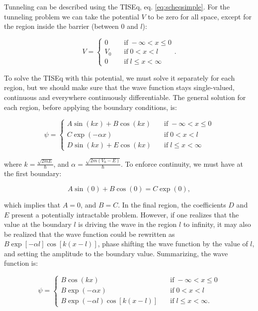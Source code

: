 \documentclass[
  english,
  9pt,
]{extbook}
\theoremstyle{definition}
\theoremstyle{definition}
\theoremstyle{definition}
\theoremstyle{definition}
\theoremstyle{remark}
\begin{document}
Tunneling can be described using the TISEq, eq. \eqref{eq:scheqsimple}. For the tunneling problem we can take the potential \(V\) to be zero for all space, except for the region inside the barrier (between \(0\) and \(l\)):

\begin{equation}
V=\begin{cases} 0\quad&\text{if}\; -\infty<x\leq 0 \\ V_0\quad&\text{if}\; 0<x<l \\ 0\quad&\text{if}\; l\leq x< \infty \end{cases}.
\label{eq:tunn1}  
\end{equation}

To solve the TISEq with this potential, we must solve it separately for each region, but we should make sure that the wave function stays single-valued, continuous and everywhere continuously differentiable. The general solution for each region, before applying the boundary conditions, is:

\begin{equation}
\psi=\begin{cases} A\sin (kx)+B\cos (kx)\quad&\text{if}\; -\infty<x\leq 0 \\ C \exp(-\alpha x) \quad&\text{if}\; 0<x<l \\ D\sin (kx)+E\cos (kx) \quad&\text{if}\; l\leq x< \infty \end{cases}
\label{eq:tunn2}  
\end{equation}

where \(k=\frac{\sqrt{2mE}}{\hbar}\), and \(\alpha=\frac{\sqrt{2m(V_0-E)}}{\hbar}\). To enforce continuity, we must have at the first boundary:

\begin{equation}
A\sin(0) +B \cos(0)=C\exp(0),
\label{eq:tunn3}  
\end{equation}

which implies that \(A=0\), and \(B=C\). In the final region, the coefficients \(D\) and \(E\) present a potentially intractable problem. However, if one realizes that the value at the boundary \(l\) is driving the wave in the region \(l\) to infinity, it may also be realized that the wave function could be rewritten as \(B\exp[-\alpha l]\cos[k(x-l)]\), phase shifting the wave function by the value of \(l\), and setting the amplitude to the boundary value. Summarizing, the wave function is:

\begin{equation}
\psi=\begin{cases} B\cos (kx)\quad&\text{if}\; -\infty<x\leq 0 \\ B \exp(-\alpha x)  \quad&\text{if}\; 0<x<l \\ B\exp(-\alpha l)\cos[k(x-l)] \quad&\text{if}\; l\leq x< \infty. \end{cases}
\label{eq:tunn5}  
\end{equation}
\end{document}
